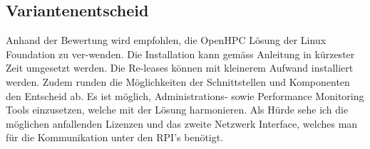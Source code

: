 \subsection{Variantenentscheid}
Anhand der Bewertung wird empfohlen, die OpenHPC Lösung der Linux Foundation zu ver-wenden. Die Installation kann gemäss Anleitung in kürzester Zeit umgesetzt werden. Die Re-leases können mit kleinerem Aufwand installiert werden. Zudem runden die Möglichkeiten der Schnittstellen und Komponenten den Entscheid ab. Es ist möglich, Administrations- sowie Performance Monitoring Tools einzusetzen, welche mit der Lösung harmonieren. Als Hürde sehe ich die möglichen anfallenden Lizenzen und das zweite Netzwerk Interface, welches man für die Kommunikation unter den RPI’s benötigt.